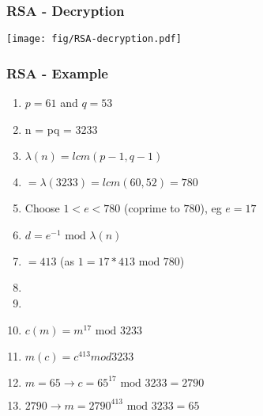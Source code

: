 \documentclass[
hyperref={pdfpagelabels=false}
,xcolor=table
]
{beamer}
\begin{document}
\begin{frame}
  \frametitle{RSA - Decryption}

  \begin{center}
    \texttt{[image: fig/RSA-decryption.pdf]}
  \end{center}
\end{frame}




  

\begin{frame}
  \frametitle{RSA - Example}
  \begin{enumerate}
  \item $p = 61$ and $q = 53$
  \item n = pq = 3233
  \item $\lambda(n) = lcm(p-1, q-1)$
  \item $= \lambda(3233) = lcm(60,52) = 780$
  \item Choose $1<e<780$ (coprime to $780$), eg $e=17$
  \item $d = e^{-1} \mbox{ mod } \lambda(n)$
  \item $= 413$ (as $1 = 17 * 413 \mbox{ mod } 780$)
  \item {}
  \item {}
  \item $c(m) = m^{17} \mbox { mod } 3233$
  \item $m(c) = c^{413} mod 3233$
  \item $m = 65 \rightarrow c = 65^{17} \mbox{ mod } 3233 = 2790$
  \item $2790 \rightarrow m = 2790^{413} \mbox{ mod } 3233 = 65$
  \end{enumerate}
  
\end{frame}
\end{document}
